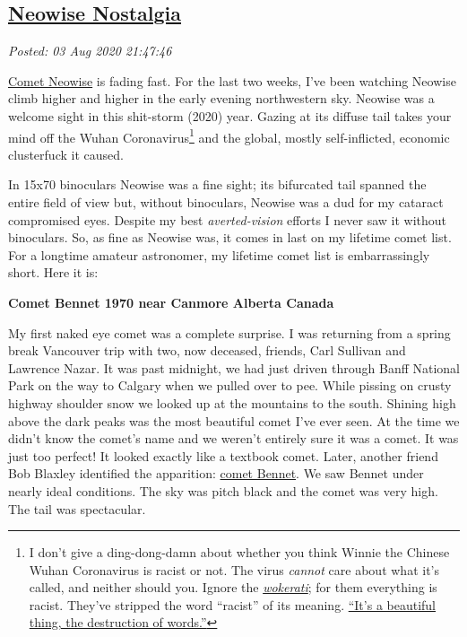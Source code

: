 %

\subsection*{\href{http://analyzethedatanotthedrivel.org/2020/08/03/neowise-nostalgia/}{Neowise Nostalgia}}


\noindent\emph{Posted: 03 Aug 2020 21:47:46}
\vspace{6pt}

\href{https://en.wikipedia.org/wiki/C/2020_F3_(NEOWISE)}{Comet Neowise}
is fading fast. For the last two weeks, I've been watching Neowise climb
higher and higher in the early evening northwestern sky. Neowise was a
welcome sight in this shit-storm (2020) year. Gazing at its diffuse tail
takes your mind off the Wuhan
Coronavirus\footnote{I don't give a ding-dong-damn about whether you think Winnie the
  Chinese Wuhan Coronavirus is racist or not. The virus \emph{cannot}
  care about what it's called, and neither should you. Ignore the
  \href{https://www.baltimoresun.com/opinion/op-ed/bs-ed-op-0630-wokerati-20190620-story.html}{\emph{wokerati}};
  for them everything is racist. They've stripped the word ``racist'' of
  its meaning.
  \href{https://www.goodreads.com/quotes/553001-it-s-a-beautiful-thing-the-destruction-of-words-of-course}{``It's a beautiful thing, the destruction of words.''}} and the global,
mostly self-inflicted, economic clusterfuck it caused.

In 15x70 binoculars Neowise was a fine sight; its bifurcated tail
spanned the entire field of view but, without binoculars, Neowise was a
dud for my cataract compromised eyes. Despite my best
\emph{averted-vision} efforts I never saw it without binoculars. So, as
fine as Neowise was, it comes in last on my lifetime comet list. For a
longtime amateur astronomer, my lifetime comet list is embarrassingly
short. Here it is:

\medskip

\noindent \textbf{Comet Bennet 1970 near Canmore Alberta Canada}

\medskip

My first naked eye comet was a complete surprise. I was returning from a
spring break Vancouver trip with two, now deceased, friends, Carl
Sullivan and Lawrence Nazar. It was past midnight, we had just driven
through Banff National Park on the way to Calgary when we pulled over to
pee. While pissing on crusty highway shoulder snow we looked up at the
mountains to the south. Shining high above the dark peaks was the most
beautiful comet I've ever seen. At the time we didn't know the comet's
name and we weren't entirely sure it was a comet. It was just too
perfect! It looked exactly like a textbook comet. Later, another friend
Bob Blaxley identified the apparition:
\href{https://en.wikipedia.org/wiki/Comet_Bennett}{comet Bennet}. We saw
Bennet under nearly ideal conditions. The sky was pitch black and the
comet was very high. The tail was spectacular.

